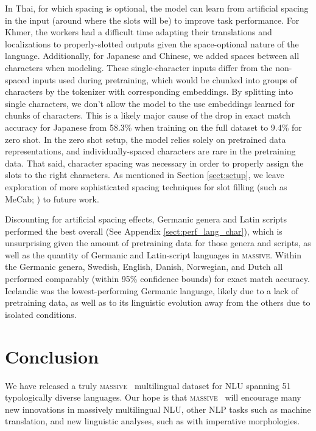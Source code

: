 \documentclass[11pt]{article}
\newcommand{\M}{\textsc{massive}}
\begin{document}
In Thai, for which spacing is optional, the model can learn from artificial spacing in the input (around where the slots will be) to improve task performance. For Khmer, the workers had a difficult time adapting their translations and localizations to properly-slotted outputs given the space-optional nature of the language. Additionally, for Japanese and Chinese, we added spaces between all characters when modeling. These single-character inputs differ from the non-spaced inputs used during pretraining, which would be chunked into groups of characters by the tokenizer with corresponding embeddings. By splitting into single characters, we don't allow the model to the use embeddings learned for chunks of characters. This is a likely major cause of the drop in exact match accuracy for Japanese from 58.3\% when training on the full dataset to 9.4\% for zero shot. In the zero shot setup, the model relies solely on pretrained data representations, and individually-spaced characters are rare in the pretraining data. That said, character spacing was necessary in order to properly assign the slots to the right characters. As mentioned in Section \ref{sect:setup}, we leave exploration of more sophisticated spacing techniques for slot filling (such as MeCab; \citealt{Kudo2005MeCabY}) to future work.

Discounting for artificial spacing effects, Germanic genera and Latin scripts performed the best overall (See Appendix \ref{sect:perf_lang_char}), which is unsurprising given the amount of pretraining data for those genera and scripts, as well as the quantity of Germanic and Latin-script languages in \M{}. Within the Germanic genera, Swedish, English, Danish, Norwegian, and Dutch all performed comparably (within 95\% confidence bounds) for exact match accuracy. Icelandic was the lowest-performing Germanic language, likely due to a lack of pretraining data, as well as to its linguistic evolution away from the others due to isolated conditions.

\section{Conclusion}

We have released a truly \M~ multilingual dataset for NLU spanning 51 typologically diverse languages. Our hope is that \M~ will encourage many new innovations in massively multilingual NLU, other NLP tasks such as machine translation, and new linguistic analyses, such as with imperative morphologies. 
\end{document}
